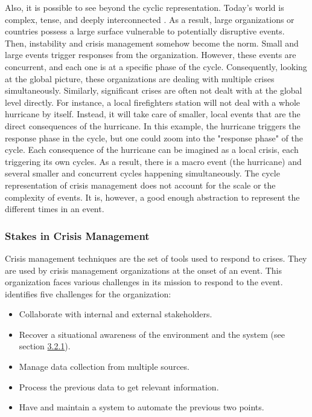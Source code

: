 Also, it is possible to see beyond the cyclic representation.
Today's world is complex, tense, and deeply interconnected \parencite{benabenInstabilityNormPhysicsbased2021}.
As a result, large organizations or countries possess a large surface vulnerable to potentially disruptive events.
Then, instability and crisis management somehow become the norm.
Small and large events trigger responses from the organization.
However, these events are concurrent, and each one is at a specific phase of the cycle.
Consequently, looking at the global picture, these organizations are dealing with multiple crises simultaneously.
Similarly, significant crises are often not dealt with at the global level directly.
For instance, a local firefighters station will not deal with a whole hurricane by itself.
Instead, it will take care of smaller, local events that are the direct consequences of the hurricane.
In this example, the hurricane triggers the response phase in the cycle, but one could zoom into the "response phase" of the cycle.
Each consequence of the hurricane can be imagined as a local crisis, each triggering its own cycles.
As a result, there is a macro event (the hurricane) and several smaller and concurrent cycles happening simultaneously.
The cycle representation of crisis management does not account for the scale or the complexity of events.
It is, however, a good enough abstraction to represent the different times in an event.

\subsubsection{Stakes in Crisis Management}
Crisis management techniques are the set of tools used to respond to crises.
They are used by crisis management organizations at the onset of an event.
This organization faces various challenges in its mission to respond to the event.
\textcite[12--18]{fertierInterpretationAutomatiqueDonnees2018} identifies five challenges for the organization:

\begin{itemize}
    \item Collaborate with internal and external stakeholders.
    \item Recover a situational awareness of the environment and the system (see section \hyperref[sec:situational-awareness]{3.2.1}).
    \item Manage data collection from multiple sources.
    \item Process the previous data to get relevant information.
    \item Have and maintain a system to automate the previous two points.
\end{itemize}

